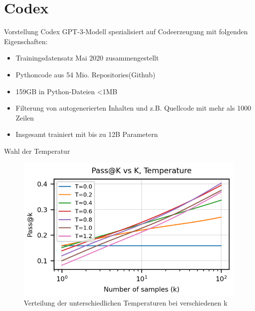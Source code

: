 \documentclass{beamer}              %
\begin{document}
\section{Codex}
\begin{frame}{Vorstellung Codex}
GPT-3-Modell spezialisiert auf Codeerzeugung mit folgenden Eigenschaften:\cite{chen2021evaluating}
\begin{itemize}
    \item Trainingsdatensatz Mai 2020 zusammengestellt
    \item Pythoncode aus 54 Mio. Repositories(Github)
    \item 159GB in Python-Dateien <1MB
    \item Filterung von autogenerierten Inhalten und z.B. Quellcode mit mehr als 1000 Zeilen
    \item Insgesamt trainiert mit bis zu 12B Parametern
\end{itemize}
\end{frame}

\begin{frame}{Wahl der Temperatur}
    \begin{figure}
        \centering
        \includegraphics[width=0.7\paperwidth]{images/passkvstemp.png}
        \caption{Verteilung der unterschiedlichen Temperaturen bei verschiedenen k\cite{chen2021evaluating}}
    \end{figure}
\end{frame}
\end{document}
